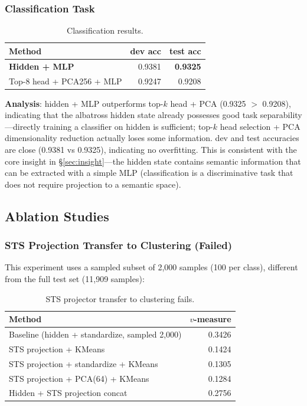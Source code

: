 \documentclass[11pt]{article}
\begin{document}
\subsubsection{Classification Task}

\begin{table}[h]
\centering
\begin{tabular}{lrr}
\toprule
Method & dev acc & test acc \\
\midrule
\textbf{Hidden + MLP} & 0.9381 & \textbf{0.9325} \\
Top-8 head + PCA256 + MLP & 0.9247 & 0.9208 \\
\bottomrule
\end{tabular}
\caption{Classification results.}
\end{table}

\textbf{Analysis}: hidden + MLP outperforms top-$k$ head + PCA (0.9325 $>$
0.9208), indicating that the albatross hidden state already possesses good
task separability---directly training a classifier on hidden is sufficient;
top-$k$ head selection + PCA dimensionality reduction actually loses some
information. dev and test accuracies are close (0.9381 vs 0.9325),
indicating no overfitting. This is consistent with the core insight in
\S\ref{sec:insight}---the hidden state contains semantic information that
can be extracted with a simple MLP (classification is a discriminative task
that does not require projection to a semantic space).

\subsection{Ablation Studies}
\label{sec:ablation}

\subsubsection{STS Projection Transfer to Clustering (Failed)}

This experiment uses a sampled subset of 2,000 samples (100 per class),
different from the full test set (11,909 samples):

\begin{table}[h]
\centering
\begin{tabular}{lr}
\toprule
Method & $v$-measure \\
\midrule
Baseline (hidden + standardize, sampled 2,000) & 0.3426 \\
STS projection + KMeans & 0.1424 \\
STS projection + standardize + KMeans & 0.1305 \\
STS projection + PCA(64) + KMeans & 0.1284 \\
Hidden + STS projection concat & 0.2756 \\
\bottomrule
\end{tabular}
\caption{STS projector transfer to clustering fails.}
\end{table}
\end{document}
